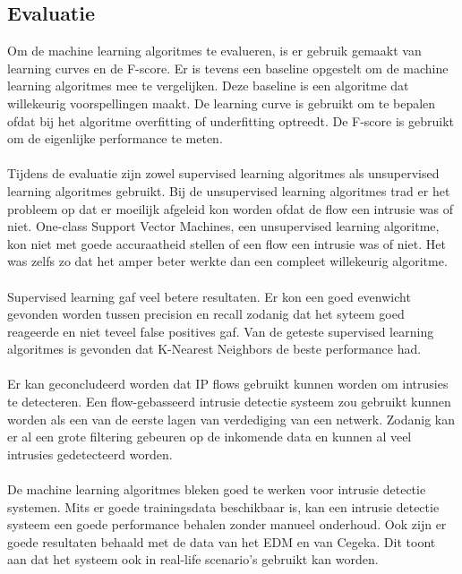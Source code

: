 \begin{samenvatting}
\section{Evaluatie}
Om de machine learning algoritmes te evalueren, is er gebruik gemaakt van learning curves en de F-score. Er is tevens een baseline opgestelt om de machine learning algoritmes mee te vergelijken. Deze baseline is een algoritme dat willekeurig voorspellingen maakt. De learning curve is gebruikt om te bepalen ofdat bij het algoritme overfitting of underfitting optreedt. De F-score is gebruikt om de eigenlijke performance te meten.\\
\\
Tijdens de evaluatie zijn zowel supervised learning algoritmes als unsupervised learning algoritmes gebruikt. Bij de unsupervised learning algoritmes trad er het probleem op dat er moeilijk afgeleid kon worden ofdat de flow een intrusie was of niet. One-class Support Vector Machines, een unsupervised learning algoritme, kon niet met goede accuraatheid stellen of een flow een intrusie was of niet. Het was zelfs zo dat het amper beter werkte dan een compleet willekeurig algoritme.\\
\\
Supervised learning gaf veel betere resultaten. Er kon een goed evenwicht gevonden worden tussen precision en recall zodanig dat het syteem goed reageerde en niet teveel false positives gaf. Van de geteste supervised learning algoritmes is gevonden dat K-Nearest Neighbors de beste performance had. \\
\\
Er kan geconcludeerd worden dat IP flows gebruikt kunnen worden om intrusies te detecteren. Een flow-gebasseerd intrusie detectie systeem zou gebruikt kunnen worden als een van de eerste lagen van verdediging van een netwerk. Zodanig kan er al een grote filtering gebeuren op de inkomende data en kunnen al veel intrusies gedetecteerd worden. \\
\\
De machine learning algoritmes bleken goed te werken voor intrusie detectie systemen. Mits er goede trainingsdata beschikbaar is, kan een intrusie detectie systeem een goede performance behalen zonder manueel onderhoud. Ook zijn er goede resultaten behaald met de data van het EDM en van Cegeka. Dit toont aan dat het systeem ook in real-life scenario's gebruikt kan worden.

\end{samenvatting}